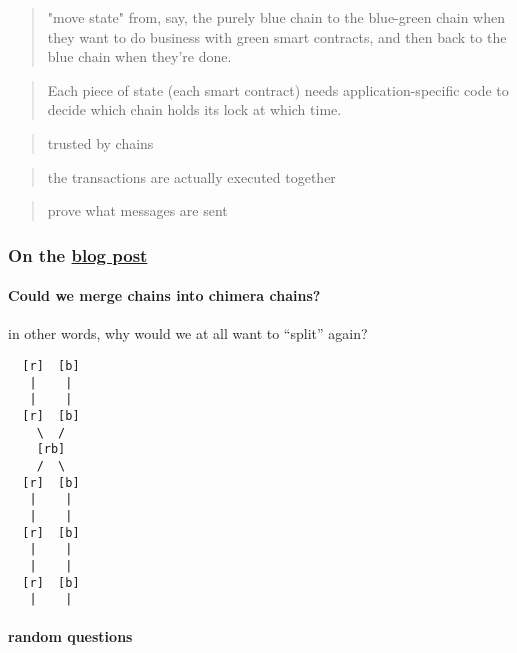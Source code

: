\documentclass{article}
\theoremstyle{definition}
\begin{document}
  \begin{quote}
  "move state" from, say, the purely blue chain to the blue-green chain when they want to do business with green smart contracts, and then back to the blue chain when they're done.
\end{quote}

\begin{quote}
  Each piece of state (each smart contract) needs application-specific code to decide which chain holds its lock at which time.
\end{quote}
\begin{quote}
  trusted by chains
\end{quote}

\begin{quote}
  the transactions are actually executed together
\end{quote}

\begin{quote}
  prove what messages are sent
\end{quote}
\subsubsection{On the %
  \href{https://anoma.net/blog/heterogeneous-paxos-and-multi-chain-atomic-commits/}{%
    blog post%
  }
}
\label{sec:blog-post-discussion}

\paragraph{Could we merge chains into chimera chains?}

in other words,
why would we at all want to “split” again?

\begin{verbatim}
  [r]  [b]
   |    |
   |    |
  [r]  [b]
    \  / 
    [rb]
    /  \ 
  [r]  [b]
   |    |
   |    |
  [r]  [b]
   |    |
   |    |
  [r]  [b]
   |    |
\end{verbatim}

\paragraph{random questions}
\end{document}

